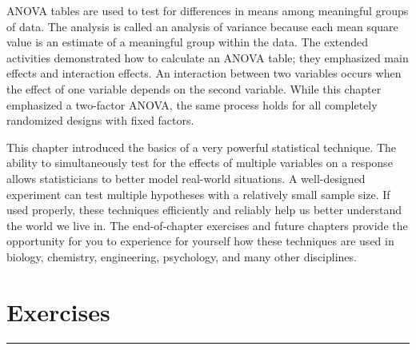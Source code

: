 \documentclass[
]{report}
\newcounter{excount}
\begin{document}
ANOVA tables are used to test for differences in means among meaningful groups of data. The analysis is called an analysis of variance because each mean square value is an estimate of a meaningful group within the data. The extended activities demonstrated how to calculate an ANOVA table; they emphasized main effects and interaction effects. An interaction between two variables occurs when the effect of one variable depends on the second variable. While this chapter emphasized a two-factor ANOVA, the same process holds for all completely randomized designs with fixed factors.

This chapter introduced the basics of a very powerful statistical technique. The ability to simultaneously test for the effects of multiple variables on a response allows statisticians to better model real-world situations. A well-designed experiment can test multiple hypotheses with a relatively small sample size. If used properly, these techniques efficiently and reliably help us better understand the world we live in. The end-of-chapter exercises and future chapters provide the opportunity for you to experience for yourself how these techniques are used in biology, chemistry, engineering, psychology, and many other disciplines.

\hypertarget{exercises-3}{%
\section*{\texorpdfstring{\textbf{Exercises}}{Exercises}}\label{exercises-3}}

\vspace{-2em}

\noindent

\rule{\linewidth}{0.4pt}
\setcounter{excount}{0}
\end{document}
